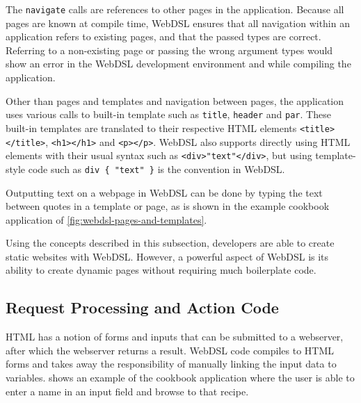       The \texttt{navigate} calls are references to other pages in the application. Because all pages are known at compile time, WebDSL ensures that all navigation within an application refers to existing pages, and that the passed types are correct. Referring to a non-existing page or passing the wrong argument types would show an error in the WebDSL development environment and while compiling the application.
      
      Other than pages and templates and navigation between pages, the application uses various calls to built-in template such as \texttt{title}, \texttt{header} and \texttt{par}. These built-in templates are translated to their respective HTML elements \texttt{<title></title>}, \texttt{<h1></h1>} and \texttt{<p></p>}. WebDSL also supports directly using HTML elements with their usual syntax such as \texttt{<div>"text"</div>}, but using template-style code such as \texttt{div \{ "text" \}} is the convention in WebDSL.

      Outputting text on a webpage in WebDSL can be done by typing the text between quotes in a template or page, as is shown in the example cookbook application of \cref{fig:webdsl-pages-and-templates}.

      Using the concepts described in this subsection, developers are able to create static websites with WebDSL. However, a powerful aspect of WebDSL is its ability to create dynamic pages without requiring much boilerplate code.

    \subsection{\label{subsec:request-processing}Request Processing and Action Code}

      HTML has a notion of forms and inputs that can be submitted to a webserver, after which the webserver returns a result. WebDSL code compiles to HTML forms and takes away the responsibility of manually linking the input data to variables.  shows an example of the cookbook application where the user is able to enter a name in an input field and browse to that recipe.

